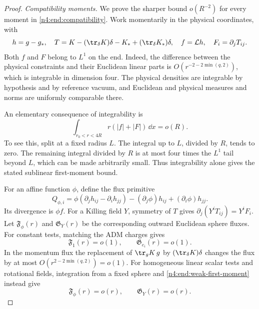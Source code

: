 \begin{proof}
\smallskip
\noindent\emph{Compatibility moments.} We prove the sharper bound \(o(R^{-2})\) for every moment in
\eqref{n4:end:compatibility}. Work momentarily in the physical coordinates,
with
\[
 h=g-g_*,\quad
 T=K-(\tr_\delta K)\delta-K_*+(\tr_\delta K_*)\delta,
 \quad f=\mathcal Lh,\quad F_i=\partial_jT_{ij}.
\]
Both \(f\) and \(F\) belong to \(L^1\) on the end. Indeed, the
difference between the physical constraints and their Euclidean linear
parts is \(O(r^{-2-2\min(q,2)})\), which is integrable in dimension
four. The physical densities are integrable by hypothesis and by
reference vacuum, and Euclidean and physical measures and norms are
uniformly comparable there.

An elementary consequence of integrability is
\begin{equation}\label{n4:end:weak-first-moment}
 \int_{r_0<r<4R}r(|f|+|F|)\,\dd x=o(R).
\end{equation}
To see this, split at a fixed radius \(L\). The integral up to \(L\),
divided by \(R\), tends to zero. The remaining integral divided by
\(R\) is at most four times the \(L^1\) tail beyond \(L\), which can
be made arbitrarily small. Thus integrability alone gives the stated
sublinear first-moment bound.

For an affine function \(\phi\), define the flux primitive
\[
 Q_{\phi,i}
 =\phi(\partial_jh_{ij}-\partial_i h_{jj})
       -(\partial_j\phi)h_{ij}+(\partial_i\phi)h_{jj}.
\]
Its divergence is \(\phi f\). For a Killing field \(Y\), symmetry
of \(T\) gives \(\partial_j(Y^iT_{ij})=Y^iF_i\).
Let \(\mathfrak F_\phi(r)\) and \(\mathfrak G_Y(r)\) be the corresponding
outward Euclidean sphere fluxes. For constant tests, matching the ADM
charges gives
\[
 \mathfrak F_1(r)=o(1),\qquad
 \mathfrak G_{e_i}(r)=o(1).
\]
In the momentum flux the replacement of \(\tr_gK\,g\) by
\((\tr_\delta K)\delta\) changes the flux by at most
\(O(r^{2-2\min(q,2)})=o(1)\). For homogeneous linear scalar tests and
rotational fields, integration from a fixed sphere and
\eqref{n4:end:weak-first-moment} instead give
\[
 \mathfrak F_\phi(r)=o(r),\qquad \mathfrak G_Y(r)=o(r).
\]


\end{proof}
